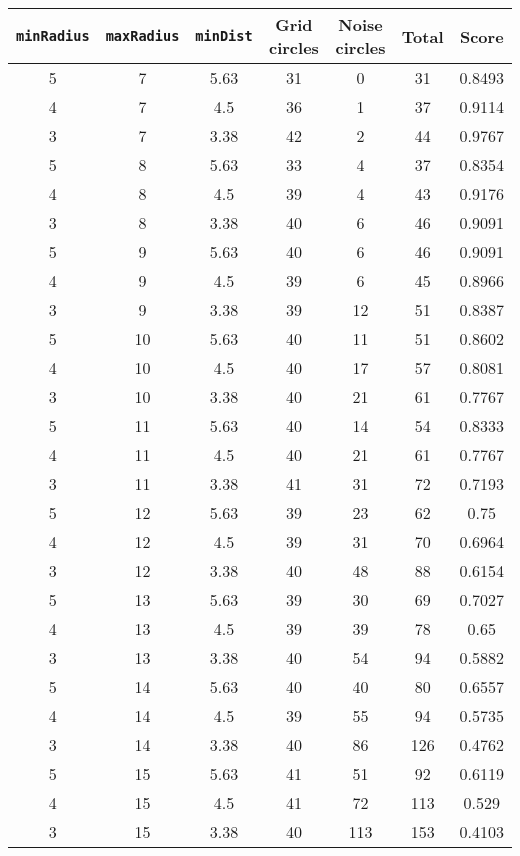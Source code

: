 \documentclass[letterpaper, 12pt]{article}
\begin{document}
\begin{longtable}{|c|c|c|c|c|c|c|}
\hline
\textbf{\texttt{minRadius}} & \textbf{\texttt{maxRadius}} & \textbf{\texttt{minDist}} & \textbf{Grid circles} & \textbf{Noise circles} & \textbf{Total} & \textbf{Score} \\
\hline
5 & 7 & 5.63 & 31 & 0 & 31 & 0.8493 \\
\hline
4 & 7 & 4.5 & 36 & 1 & 37 & 0.9114 \\
\hline
3 & 7 & 3.38 & 42 & 2 & 44 & 0.9767 \\
\hline
5 & 8 & 5.63 & 33 & 4 & 37 & 0.8354 \\
\hline
4 & 8 & 4.5 & 39 & 4 & 43 & 0.9176 \\
\hline
3 & 8 & 3.38 & 40 & 6 & 46 & 0.9091 \\
\hline
5 & 9 & 5.63 & 40 & 6 & 46 & 0.9091 \\
\hline
4 & 9 & 4.5 & 39 & 6 & 45 & 0.8966 \\
\hline
3 & 9 & 3.38 & 39 & 12 & 51 & 0.8387 \\
\hline
5 & 10 & 5.63 & 40 & 11 & 51 & 0.8602 \\
\hline
4 & 10 & 4.5 & 40 & 17 & 57 & 0.8081 \\
\hline
3 & 10 & 3.38 & 40 & 21 & 61 & 0.7767 \\
\hline
5 & 11 & 5.63 & 40 & 14 & 54 & 0.8333 \\
\hline
4 & 11 & 4.5 & 40 & 21 & 61 & 0.7767 \\
\hline
3 & 11 & 3.38 & 41 & 31 & 72 & 0.7193 \\
\hline
5 & 12 & 5.63 & 39 & 23 & 62 & 0.75 \\
\hline
4 & 12 & 4.5 & 39 & 31 & 70 & 0.6964 \\
\hline
3 & 12 & 3.38 & 40 & 48 & 88 & 0.6154 \\
\hline
5 & 13 & 5.63 & 39 & 30 & 69 & 0.7027 \\
\hline
4 & 13 & 4.5 & 39 & 39 & 78 & 0.65 \\
\hline
3 & 13 & 3.38 & 40 & 54 & 94 & 0.5882 \\
\hline
5 & 14 & 5.63 & 40 & 40 & 80 & 0.6557 \\
\hline
4 & 14 & 4.5 & 39 & 55 & 94 & 0.5735 \\
\hline
3 & 14 & 3.38 & 40 & 86 & 126 & 0.4762 \\
\hline
5 & 15 & 5.63 & 41 & 51 & 92 & 0.6119 \\
\hline
4 & 15 & 4.5 & 41 & 72 & 113 & 0.529 \\
\hline
3 & 15 & 3.38 & 40 & 113 & 153 & 0.4103 \\

\end{longtable}
\end{document}
